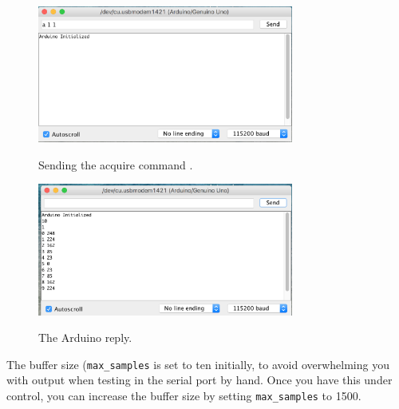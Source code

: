 \documentclass[12pt]{article}
\begin{document}
\begin{figure}[htbp]
\begin{center}
{\includegraphics[width=0.75\textwidth]{figs/send.png}}
\end{center}
\caption{\label{fig:send} Sending the acquire command .}
\end{figure}

\begin{figure}[htbp]
\begin{center}
{\includegraphics[width=0.75\textwidth]{figs/reply.png}}
\end{center}
\caption{\label{fig:reply} The Arduino reply.}
\end{figure}
The buffer size ({\tt max\_samples} is set to ten initially, to avoid overwhelming you with output when testing in the serial port by hand.  Once you have this under control, you can increase the buffer size by setting {\tt max\_samples} to 1500. 
\end{document}
